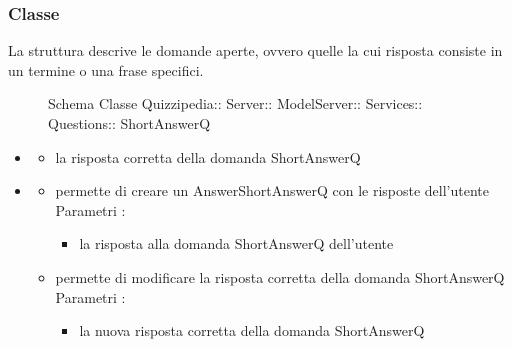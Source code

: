 \subsubsection{Classe }
La struttura descrive le domande aperte, ovvero quelle la cui risposta consiste in un termine o una frase specifici.
\begin{figure}[H]
\centering
\noindent{}
\caption[Schema Classe ShortAnswerQ]{Schema Classe Quizzipedia:: Server:: ModelServer:: Services:: Questions:: ShortAnswerQ}
\end{figure}
\begin{itemize}
\item {}
\begin{itemize}
\item {}
\newline
la risposta corretta della domanda ShortAnswerQ
\end{itemize}
\item {}
\begin{itemize}
\item {}
\newline
permette di creare un AnswerShortAnswerQ con le risposte dell'utente
\newline
Parametri :
\begin{itemize}
\item {}
\newline
la risposta alla domanda ShortAnswerQ dell'utente
\end{itemize}
\item {}
\newline
permette di modificare la risposta corretta della domanda ShortAnswerQ
\newline
Parametri :
\begin{itemize}
\item {}
\newline
la nuova risposta corretta della domanda ShortAnswerQ
\end{itemize}
\end{itemize}
\end{itemize}

